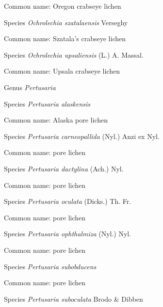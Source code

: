 \documentclass[9pt, article]{memoir}
\begin{document}
\begin{multicols}{2}
Common name: Oregon crabseye lichen

\vspace{6pt}\noindent\hspace{36pt}Species \textit{Ochrolechia szatalaensis} Verseghy


Common name: Szatala's crabseye lichen

\vspace{6pt}\noindent\hspace{36pt}Species \textit{Ochrolechia upsaliensis} (L.) A. Massal.


Common name: Upsala crabseye lichen

\vspace{6pt}\noindent\hspace{30pt}Genus \textit{Pertusaria}


\vspace{6pt}\noindent\hspace{36pt}Species \textit{Pertusaria alaskensis}


Common name: Alaska pore lichen

\vspace{6pt}\noindent\hspace{36pt}Species \textit{Pertusaria carneopallida} (Nyl.) Anzi ex Nyl.


Common name: pore lichen

\vspace{6pt}\noindent\hspace{36pt}Species \textit{Pertusaria dactylina} (Ach.) Nyl.


Common name: pore lichen

\vspace{6pt}\noindent\hspace{36pt}Species \textit{Pertusaria oculata} (Dicks.) Th. Fr.


Common name: pore lichen

\vspace{6pt}\noindent\hspace{36pt}Species \textit{Pertusaria ophthalmiza} (Nyl.) Nyl.


Common name: pore lichen

\vspace{6pt}\noindent\hspace{36pt}Species \textit{Pertusaria subobducens}


Common name: pore lichen

\vspace{6pt}\noindent\hspace{36pt}Species \textit{Pertusaria suboculata} Brodo \& Dibben



\end{multicols}
\end{document}
